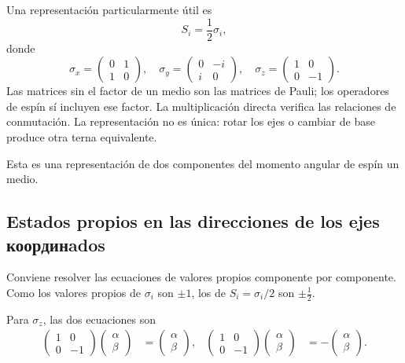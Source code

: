 Una representación particularmente útil es
\begin{equation}
S_i=\frac12\sigma_i,
\end{equation}
donde
\begin{equation}
\sigma_x=
\begin{pmatrix}
0&1\\
1&0
\end{pmatrix},
\quad
\sigma_y=
\begin{pmatrix}
0&-i\\
i&0
\end{pmatrix},
\quad
\sigma_z=
\begin{pmatrix}
1&0\\
0&-1
\end{pmatrix}.
\end{equation}
Las matrices sin el factor de un medio son las matrices de Pauli; los operadores de espín sí incluyen ese factor. La multiplicación directa verifica las relaciones de conmutación. La representación no es única: rotar los ejes o cambiar de base produce otra terna equivalente.

Esta es una representación de dos componentes del momento angular de espín un medio.

\subsection{Estados propios en las direcciones de los ejes координados}

Conviene resolver las ecuaciones de valores propios componente por componente. Como los valores propios de \(\sigma_i\) son \(\pm1\), los de \(S_i=\sigma_i/2\) son \(\pm\tfrac12\).

Para \(\sigma_z\), las dos ecuaciones son
\begin{align}
\begin{pmatrix}
1&0\\
0&-1
\end{pmatrix}
\begin{pmatrix}
\alpha\\
\beta
\end{pmatrix}
&=
\begin{pmatrix}
\alpha\\
\beta
\end{pmatrix},
&
\begin{pmatrix}
1&0\\
0&-1
\end{pmatrix}
\begin{pmatrix}
\alpha\\
\beta
\end{pmatrix}
&=
-
\begin{pmatrix}
\alpha\\
\beta
\end{pmatrix}.
\end{align}

